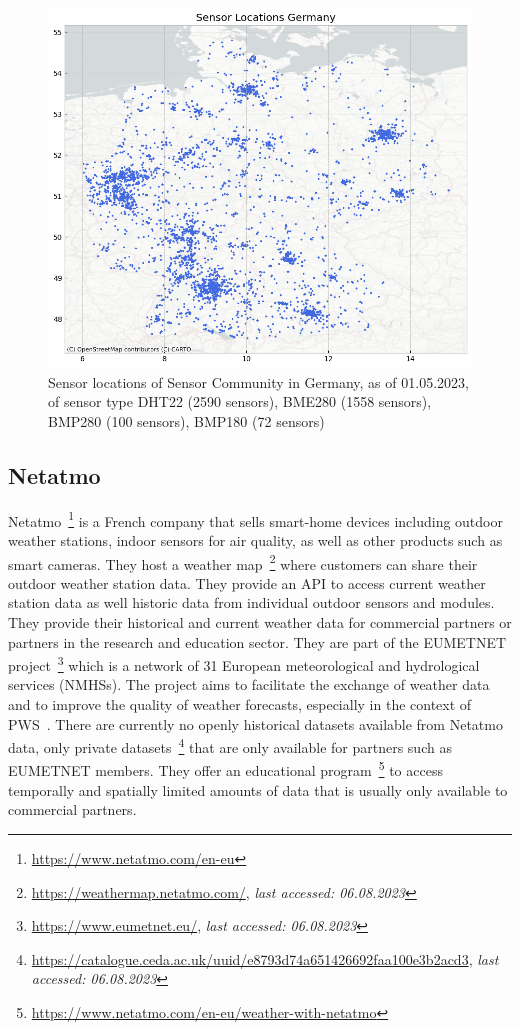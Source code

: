\begin{figure}[ht]
    \centering
    \includegraphics[width=1\textwidth]{images/sc_sensor_locations_germany.png}
    \caption{Sensor locations of Sensor Community in Germany, as of 01.05.2023, of sensor type DHT22 (2590 sensors), BME280 (1558 sensors), BMP280 (100 sensors), BMP180 (72 sensors)}
    \label{fig:sensor community sensor locations germany}
\end{figure}

\subsection{Netatmo}

Netatmo~\footnote{\url{https://www.netatmo.com/en-eu}} is a French company that sells smart-home devices including outdoor weather stations, indoor sensors for air quality, as well as other products such as smart cameras. They host a weather map~\footnote{\url{https://weathermap.netatmo.com/}, \textit{last accessed: 06.08.2023}} where customers can share their outdoor weather station data. They provide an API to access current weather station data as well historic data from individual outdoor sensors and modules.
They provide their historical and current weather data for commercial partners or partners in the research and education sector. They are part of the EUMETNET project~\footnote{\url{https://www.eumetnet.eu/}, \textit{last accessed: 06.08.2023}} which is a network of 31 European meteorological and hydrological services (NMHSs). The project aims to facilitate the exchange of weather data and to improve the quality of weather forecasts, especially in the context of PWS~\cite{hahn2022observations}. There are currently no openly historical datasets available from Netatmo data, only private datasets~\footnote{\url{https://catalogue.ceda.ac.uk/uuid/e8793d74a651426692faa100e3b2acd3}, \textit{last accessed: 06.08.2023}} that are only available for partners such as EUMETNET members. They offer an educational program~\footnote{\url{https://www.netatmo.com/en-eu/weather-with-netatmo}} to access temporally and spatially limited amounts of data that is usually only available to commercial partners.

